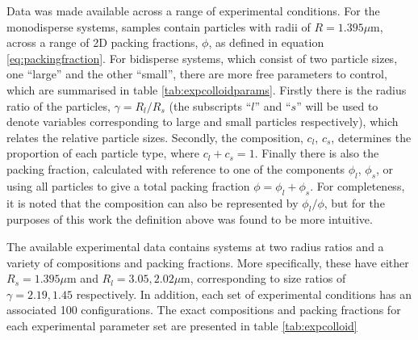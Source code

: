 Data was made available across a range of experimental conditions.
For the monodisperse systems, samples contain particles with radii of $R=1.395\mu$m, across a range of 2D packing fractions, $\phi$, as defined in equation \eqref{eq:packingfraction}.
For bidisperse systems, which consist of two particle sizes, one ``large'' and the other ``small'', there are more free parameters to control, which are summarised in table \ref{tab:expcolloidparams}.
Firstly there is the radius ratio of the particles, $\gamma=R_l/R_s$ (the subscripts ``$l$'' and ``$s$'' will be used to denote variables corresponding to large and small particles respectively), which relates the relative particle sizes.
Secondly, the composition, $c_l$, $c_s$, determines the proportion of each particle type, where $c_l+c_s=1$.
Finally there is also the packing fraction, calculated with reference to one of the components $\phi_l$, $\phi_s$, or using all particles to give a total packing fraction $\phi=\phi_l+\phi_s$.
For completeness, it is noted that the composition can also be represented by $\phi_l/\phi$, but for the purposes of this work the definition above was found to be more intuitive.

The available experimental data contains systems at two radius ratios and a variety of compositions and packing fractions.
More specifically, these have either $R_s=1.395\mu$m and $R_l=3.05,2.02\mu$m, corresponding to size ratios of $\gamma=2.19, 1.45$ respectively.
In addition, each set of experimental conditions has an associated 100 configurations. 
The exact compositions and packing fractions for each experimental parameter set are presented in table \ref{tab:expcolloid}


